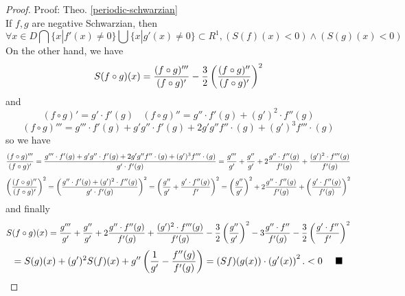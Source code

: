 \documentclass[12pt]{article}
\theoremstyle{plain}
\newtheorem{proof}{\textit{PROOF}}[section]
\begin{document}
{\color{blue}
\begin{proof} Proof: Theo. \ref{periodic-schwarzian}
\\\noindent If $f, g$ are negative Schwarzian, then 
$$
\forall x \in D\bigcap\{x | f'(x) \neq 0\}\bigcup\{x | g'(x) \neq 0\} \subset R^1, \left(S(f)(x) < 0\right) \land \left(S(g)(x) < 0\right)
$$
On the other hand, we have 
$$
S(f\circ g)(x) = {(f\circ g)''' \over (f\circ g)'} - {3 \over 2}\left((f\circ g)'' \over (f\circ g)'\right)^2
$$
and 
$$
(f \circ g)' = g'\cdot f'(g) \ \ \ \  (f \circ g)'' = g''\cdot f'(g) + (g')^2\cdot f''(g) 
$$
$$
(f \circ g)'''  = g'''\cdot f'(g) + g'g''\cdot f'(g) + 2g' g''f''\cdot (g) + (g')^3f'''\cdot (g)
$$
so we have  
$$
 {(f\circ g)''' \over (f\circ g)'} = {g'''\cdot f'(g) + g'g''\cdot f'(g) + 2g' g''f''\cdot (g) + (g')^3f'''\cdot (g) \over g'\cdot f'(g)} = {g''' \over g'} + {g'' \over g'}+ 2{g''\cdot f''(g) \over f'(g)} + {(g')^2\cdot f'''(g) \over f'(g)}
$$
$$
\left({(f\circ g)'' \over (f\circ g)'}\right)^2 
= \left({g''\cdot f'(g) + (g')^2\cdot f''(g)  \over g'\cdot f'(g)}\right)^2 
= \left({g'' \over g'} + {g'\cdot f''(g) \over f'}\right)^2
= \left({g'' \over g'}\right)^2 + 2 {g'' \cdot f''(g) \over f'(g)} + \left({g'\cdot f''(g) \over f'(g)}\right)^2
$$
and finally
$$
S(f\circ g)(x) = {g''' \over g'} + {g'' \over g'}+ 2{g''\cdot f''(g) \over f'(g)} + {(g')^2\cdot f'''(g) \over f'(g)} - {3\over 2}\left({g'' \over g'}\right)^2 - 3 {g'' \cdot f'' \over f'(g)} - {3\over 2}\left({g'\cdot f'' \over f'}\right)^2
$$
$$
= S(g)(x) + (g')^2 S(f)(x) + g''\left({1 \over g'} -  { f''(g) \over f'(g)}\right) = (Sf)(g(x))\cdot \left(g'(x)\right)^{2}.< 0\ \ \ \  \blacksquare
$$
\end{proof}
}
\end{document}
